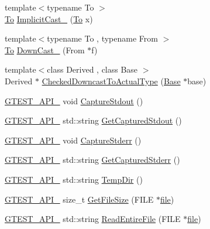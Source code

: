 \begin{DoxyCompactItemize}
\item 
{\footnotesize template$<$typename To $>$ }\\\hyperlink{classtesting_1_1internal_1_1_to}{To} \hyperlink{namespacetesting_1_1internal_a982df3f369643b175f79cda4048bc3b9}{Implicit\+Cast\+\_\+} (\hyperlink{classtesting_1_1internal_1_1_to}{To} x)
\item 
{\footnotesize template$<$typename To , typename From $>$ }\\\hyperlink{classtesting_1_1internal_1_1_to}{To} \hyperlink{namespacetesting_1_1internal_a1a1a1aed3fe00908b8a45d5ab4a33665}{Down\+Cast\+\_\+} (From $\ast$f)
\item 
{\footnotesize template$<$class Derived , class Base $>$ }\\Derived $\ast$ \hyperlink{namespacetesting_1_1internal_abfe9bfb020d38aa4e0e12c001911b22b}{Checked\+Downcast\+To\+Actual\+Type} (\hyperlink{class_base}{Base} $\ast$base)
\item 
\hyperlink{gtest-port_8h_aa73be6f0ba4a7456180a94904ce17790}{G\+T\+E\+S\+T\+\_\+\+A\+P\+I\+\_\+} void \hyperlink{namespacetesting_1_1internal_acba06d4f0343dec407738ba5544af990}{Capture\+Stdout} ()
\item 
\hyperlink{gtest-port_8h_aa73be6f0ba4a7456180a94904ce17790}{G\+T\+E\+S\+T\+\_\+\+A\+P\+I\+\_\+} std\+::string \hyperlink{namespacetesting_1_1internal_aed657219a9856a8d249a3230de0c54ce}{Get\+Captured\+Stdout} ()
\item 
\hyperlink{gtest-port_8h_aa73be6f0ba4a7456180a94904ce17790}{G\+T\+E\+S\+T\+\_\+\+A\+P\+I\+\_\+} void \hyperlink{namespacetesting_1_1internal_a8ec00d458d0d442bd64af7b5f9c22dda}{Capture\+Stderr} ()
\item 
\hyperlink{gtest-port_8h_aa73be6f0ba4a7456180a94904ce17790}{G\+T\+E\+S\+T\+\_\+\+A\+P\+I\+\_\+} std\+::string \hyperlink{namespacetesting_1_1internal_a374156401da17704099d0c33fa53adfb}{Get\+Captured\+Stderr} ()
\item 
\hyperlink{gtest-port_8h_aa73be6f0ba4a7456180a94904ce17790}{G\+T\+E\+S\+T\+\_\+\+A\+P\+I\+\_\+} std\+::string \hyperlink{namespacetesting_1_1internal_a59a959f437bd7d515b5c41dcf00229c9}{Temp\+Dir} ()
\item 
\hyperlink{gtest-port_8h_aa73be6f0ba4a7456180a94904ce17790}{G\+T\+E\+S\+T\+\_\+\+A\+P\+I\+\_\+} size\+\_\+t \hyperlink{namespacetesting_1_1internal_a06ca3f65f5e85c9ce7299b9e4cd52408}{Get\+File\+Size} (F\+I\+LE $\ast$\hyperlink{_07copy_08_2_read_camera_model_8m_a151631b2fd2bb776ef06c9f440a7ed74}{file})
\item 
\hyperlink{gtest-port_8h_aa73be6f0ba4a7456180a94904ce17790}{G\+T\+E\+S\+T\+\_\+\+A\+P\+I\+\_\+} std\+::string \hyperlink{namespacetesting_1_1internal_a2cc0be60c54a8701423fe5297e1349ee}{Read\+Entire\+File} (F\+I\+LE $\ast$\hyperlink{_07copy_08_2_read_camera_model_8m_a151631b2fd2bb776ef06c9f440a7ed74}{file})

\end{DoxyCompactItemize}
